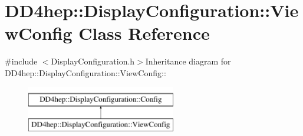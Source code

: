 \hypertarget{class_d_d4hep_1_1_display_configuration_1_1_view_config}{
\section{DD4hep::DisplayConfiguration::ViewConfig Class Reference}
\label{class_d_d4hep_1_1_display_configuration_1_1_view_config}
}


{\ttfamily \#include $<$DisplayConfiguration.h$>$}Inheritance diagram for DD4hep::DisplayConfiguration::ViewConfig::\begin{figure}[H]
\begin{center}
\leavevmode
\includegraphics[height=2cm]{class_d_d4hep_1_1_display_configuration_1_1_view_config}
\end{center}
\end{figure}
